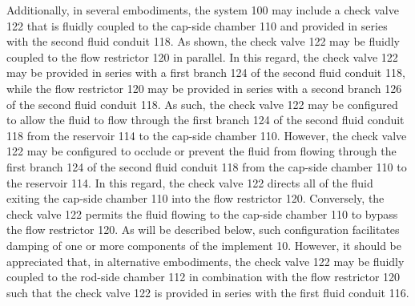 \documentclass[11pt,a4paper]{article}
\begin{document}
Additionally, in several embodiments, the system 100 may include a check valve 122 that is fluidly coupled to the cap-side chamber 110 and provided in series with the second fluid conduit 118. As shown, the check valve 122 may be fluidly coupled to the flow restrictor 120 in parallel. In this regard, the check valve 122 may be provided in series with a first branch 124 of the second fluid conduit 118, while the flow restrictor 120 may be provided in series with a second branch 126 of the second fluid conduit 118. As such, the check valve 122 may be configured to allow the fluid to flow through the first branch 124 of the second fluid conduit 118 from the reservoir 114 to the cap-side chamber 110. However, the check valve 122 may be configured to occlude or prevent the fluid from flowing through the first branch 124 of the second fluid conduit 118 from the cap-side chamber 110 to the reservoir 114. In this regard, the check valve 122 directs all of the fluid exiting the cap-side chamber 110 into the flow restrictor 120. Conversely, the check valve 122 permits the fluid flowing to the cap-side chamber 110 to bypass the flow restrictor 120. As will be described below, such configuration facilitates damping of one or more components of the implement 10. However, it should be appreciated that, in alternative embodiments, the check valve 122 may be fluidly coupled to the rod-side chamber 112 in combination with the flow restrictor 120 such that the check valve 122 is provided in series with the first fluid conduit 116.
\end{document}
